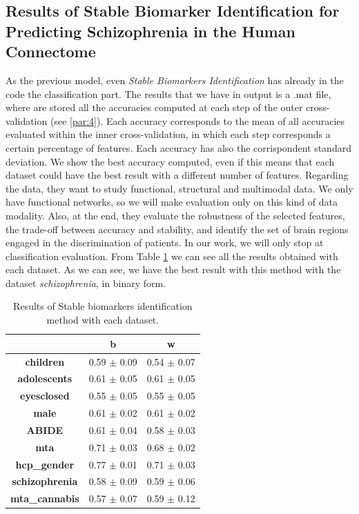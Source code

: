 \subsection{Results of Stable Biomarker Identification for Predicting Schizophrenia in the Human Connectome}

As the previous model, even \textit{Stable Biomarkers Identification} has already in the code the classification part. The results that we have in output is a .mat file, where are stored all the accuracies computed at each step of the outer cross-validation (see \ref{par:4}). Each accuracy corresponds to the mean of all accuracies evaluated within the inner cross-validation, in which each step corresponds a certain percentage of features. Each accuracy has also the corrispondent standard deviation. We show the best accuracy computed, even if this means that each dataset could have the best result with a different number of features. Regarding the data, they want to study functional, structural and multimodal data. We only have functional networks, so we will make evaluation only on this kind of data modality. Also, at the end, they evaluate the robustness of the selected features, the trade-off between accuracy and stability, and identify the set of brain regions engaged in the discrimination of patients. In our work, we will only stop at classification evaluation. From Table \ref{tab:biomarkers} we can see all the results obtained with each dataset. As we can see, we have the best result with this method with the dataset \textit{schizophrenia}, in binary form.
\vspace{0.5cm}

\begin{table}
	\centering
	\begin{tabular}{c|l|c} 
		\toprule
		& \multicolumn{1}{c|}{b} & w                \\ 
		\midrule
		\textbf{children}      & 0.59 $\pm$ 0.09        & 0.54 $\pm$ 0.07  \\
		\textbf{adolescents}   & 0.61 $\pm$ 0.05        & 0.61 $\pm$ 0.05  \\
		\textbf{eyesclosed}    & 0.55 $\pm$ 0.05        & 0.55 $\pm$ 0.05  \\
		\textbf{male}          & 0.61 $\pm$ 0.02        & 0.61 $\pm$ 0.02  \\
		\textbf{ABIDE}         & 0.61 $\pm$ 0.04        & 0.58 $\pm$ 0.03  \\
		\textbf{mta}           & 0.71 $\pm$ 0.03        & 0.68 $\pm$ 0.02  \\
		\textbf{hcp\_gender}   & 0.77 $\pm$ 0.01        & 0.71 $\pm$ 0.03  \\
		\textbf{schizophrenia} & 0.58 $\pm$ 0.09        & 0.59 $\pm$ 0.06  \\
		\textbf{mta\_cannabis} & 0.57 $\pm$ 0.07        & 0.59 $\pm$ 0.12 
	\end{tabular}
\caption{Results of Stable biomarkers identification method with each dataset.}
\label{tab:biomarkers}
\end{table}

